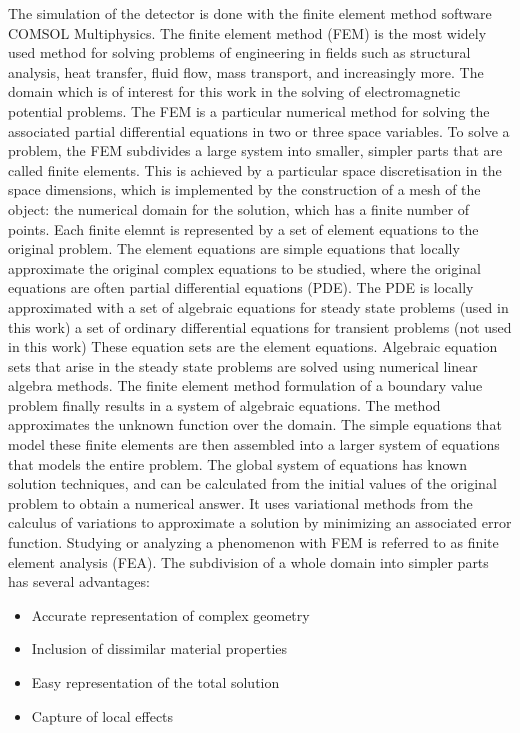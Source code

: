 The simulation of the detector is done with the finite element method software COMSOL Multiphysics.
The finite element method (FEM) is the most widely used method for solving problems of engineering in fields such as structural analysis, heat transfer, fluid flow, mass transport, and increasingly more. The domain which is of interest for this work in the solving of electromagnetic potential problems.  The FEM is a particular numerical method for solving the associated partial differential equations in two or three space variables. 
To solve a problem, the FEM subdivides a large system into smaller, simpler parts that are called finite elements. This is achieved by a particular space discretisation in the space dimensions, which is implemented by the construction of a mesh of the object: the numerical domain for the solution, which has a finite number of points. Each finite elemnt is represented by a set of element equations to the original problem. The element equations are simple equations that locally approximate the original complex equations to be studied, where the original equations are often partial differential equations (PDE). The PDE is locally approximated with 
a set of algebraic equations for steady state problems (used in this work)
a set of ordinary differential equations for transient problems (not used in this work)
These equation sets are the element equations. Algebraic equation sets that arise in the steady state problems are solved using numerical linear algebra methods.
The finite element method formulation of a boundary value problem finally results in a system of algebraic equations. The method approximates the unknown function over the domain. The simple equations that model these finite elements are then assembled into a larger system of equations that models the entire problem. The global system of equations has known solution techniques, and can be calculated from the initial values of the original problem to obtain a numerical answer. It uses variational methods from the calculus of variations to approximate a solution by minimizing an associated error function. 
Studying or analyzing a phenomenon with FEM is referred to as finite element analysis (FEA). 
The subdivision of a whole domain into simpler parts has several advantages:
\begin{itemize}
	\item Accurate representation of complex geometry 
	\item Inclusion of dissimilar material properties 
	\item Easy representation of the total solution 
	\item Capture of local effects
\end{itemize}

